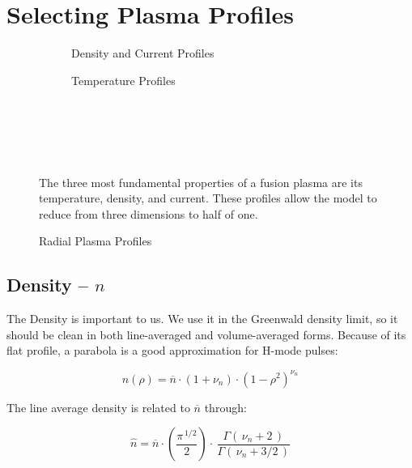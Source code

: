 \chapter{Selecting Plasma Profiles}

\label{chapter:profiles}

\begin{figure*}[h]
    \centering
    \hfill 
    \begin{subfigure}[t]{0.45\textwidth}
        \centering
		\begin{adjustbox}{width=\textwidth}
			\Large
			
		\end{adjustbox}
        \caption{Density and Current Profiles}
    \end{subfigure}
    \hfill
    \begin{subfigure}[t]{0.45\textwidth}
        \centering
		\begin{adjustbox}{width=\textwidth}
			\Large
			
		\end{adjustbox}
        \caption{Temperature Profiles}
    \end{subfigure}
    \hfill \hfill ~\\ ~\\ ~\\
    \caption{Radial Plasma Profiles} ~\\
    \small The three most fundamental properties of a fusion plasma are its temperature, density, and current. These profiles allow the model to reduce from three dimensions to half of one.
\end{figure*}

\section{Density -- $n$}

The Density is important to us. We use it in the Greenwald density limit, so it should be clean in both line-averaged and volume-averaged forms. Because of its flat profile, a parabola is a good approximation for H-mode pulses:

\begin{equation}
	n(\rho) = \overline{n} \cdot \left(1 + \nu_n \right) \cdot \left( 1 - \rho^2  \right)^{\nu_n}
\end{equation}

The line average density is related to $\overline{n}$ through:

\begin{equation}
	\hat{n} =  \overline{n} \cdot \left( \frac{\pi ^ { \, 1/2} }{2} \right)  \cdot \, \frac{ \Gamma( \, \nu_n + 2 \, ) }{ \Gamma( \, \nu_n + 3/2 \, ) }
\end{equation}

